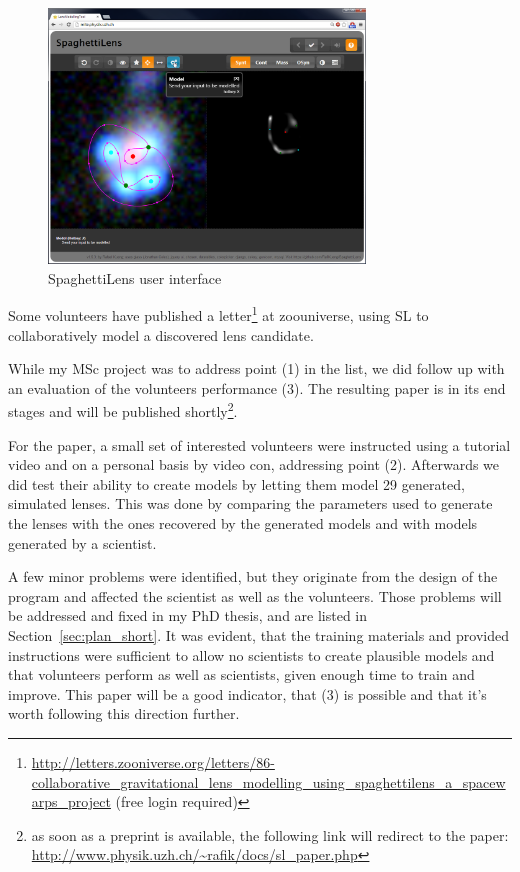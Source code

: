 \documentclass[11pt]{article}
\begin{document}
\begin{figure}
	\centering
		\includegraphics[width=0.75\textwidth]{img/client_screen.png}
	\caption{SpaghettiLens user interface}
	\label{fig:client_screen}
\end{figure}


Some volunteers have published a letter\footnote{\url{http://letters.zooniverse.org/letters/86-collaborative_gravitational_lens_modelling_using_spaghettilens_a_spacewarps_project} (free login required)} at zoouniverse, using SL to collaboratively model a discovered lens candidate.


While my MSc project was to address point (1) in the list, we did follow up with an evaluation of the volunteers performance (3).
The resulting paper is in its end stages and will be published shortly\footnote{as soon as a preprint is available, the following link will redirect to the paper:
\url{http://www.physik.uzh.ch/~rafik/docs/sl_paper.php}}.

For the paper, a small set of interested volunteers were instructed using a tutorial video and on a personal basis by video con, addressing point (2).
Afterwards we did test their ability to create models by letting them model 29 generated, simulated lenses.
This was done by comparing the parameters used to generate the lenses with the ones recovered by the generated models and with models generated by a scientist.

A few minor problems were identified, but they originate from the design of the program and affected the scientist as well as the volunteers.
Those problems will be addressed and fixed in my PhD thesis, and are listed in Section~\ref{sec:plan_short}.
It was evident, that the training materials and provided instructions were sufficient to allow no scientists to create plausible models and that volunteers perform as well as scientists, given enough time to train and improve.
This paper will be a good indicator, that (3) is possible and that it's worth following this direction further.
\end{document}
